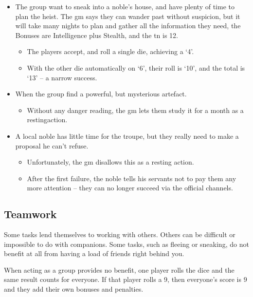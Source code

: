 \begin{multicols}{2}
\begin{exampletext}
\begin{itemize}
  \item
  The group want to sneak into a noble's house, and have plenty of time to plan the heist.
  The \gls{gm} says they can wander past without suspicion, but it will take many nights to plan and gather all the information they need, the Bonuses are Intelligence plus Stealth, and the \gls{tn} is 12.
    \begin{itemize}
    \item
    The players accept, and roll a single die, achieving a `4'.
    \item
    With the other die automatically on `6', their roll is `10', and the total is `13' -- a narrow success.
    \end{itemize}
  \item
  When the group find a powerful, but mysterious artefact.
  \begin{itemize}
    \item
    Without any danger reading, the \gls{gm} lets them study it for a month as a \gls{restingaction}.
  \end{itemize}
  \item
  A local noble has little time for the troupe, but they really need to make a proposal he can't refuse.
  \begin{itemize}
    \item
    Unfortunately, the \gls{gm} disallows this as a resting action.
    \item
    After the first failure, the noble tells his servants not to pay them any more attention -- they can no longer succeed via the official channels.
  \end{itemize}

\end{itemize}
\end{exampletext}

\subsection{Teamwork}
\label{teamwork}

Some tasks lend themselves to working with others. Others can be difficult or impossible to do with companions. Some tasks, such as fleeing or sneaking, do not benefit at all from having a load of friends right behind you.

When acting as a group provides no benefit, one player rolls the dice and the same result counts for everyone.  If that player rolls a 9, then everyone's score is 9 and they add their own bonuses and penalties.


\end{multicols}

